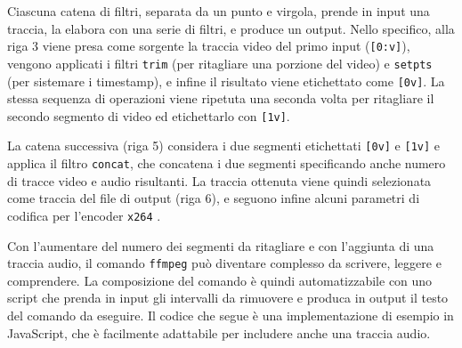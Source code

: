 Ciascuna catena di filtri, separata da un punto e virgola, prende in input una traccia, la elabora con una serie di filtri, e produce un output. Nello specifico, alla riga 3 viene presa come sorgente la traccia video del primo input (\texttt{[0:v]}), vengono applicati i filtri \texttt{trim} (per ritagliare una porzione del video) e \texttt{setpts} (per sistemare i timestamp\footnotemark{}), e infine il risultato viene etichettato come \texttt{[0v]}. La stessa sequenza di operazioni viene ripetuta una seconda volta per ritagliare il secondo segmento di video ed etichettarlo con \texttt{[1v]}.

La catena successiva (riga 5) considera i due segmenti etichettati \texttt{[0v]} e \texttt{[1v]} e applica il filtro \texttt{concat}, che concatena i due segmenti specificando anche numero di tracce video e audio risultanti. La traccia ottenuta viene quindi selezionata come traccia del file di output (riga 6), e seguono infine alcuni parametri di codifica per l'encoder \texttt{x264} \cite{ozer}.



Con l'aumentare del numero dei segmenti da ritagliare e con l'aggiunta di una traccia audio, il comando \texttt{ffmpeg} può diventare complesso da scrivere, leggere e comprendere. La composizione del comando è quindi automatizzabile con uno script che prenda in input gli intervalli da rimuovere e produca in output il testo del comando da eseguire. Il codice che segue è una implementazione di esempio in JavaScript, che è facilmente adattabile per includere anche una traccia audio.

